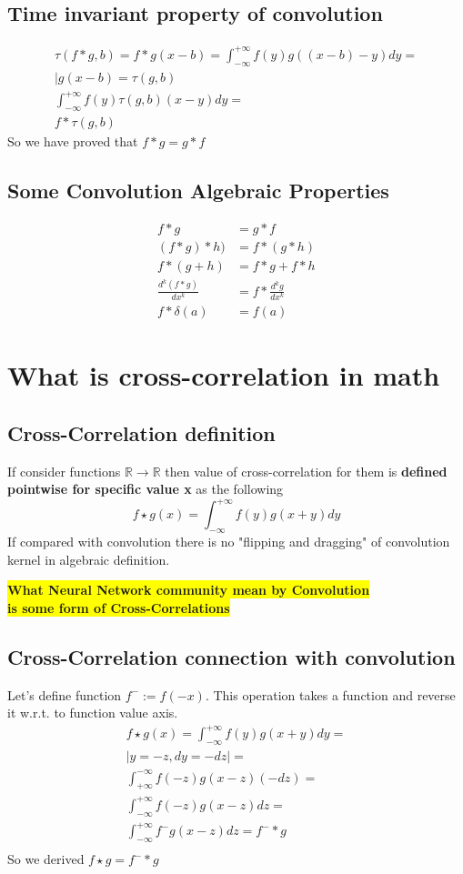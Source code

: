 \documentclass[12pt,a4paper]{article}
\theoremstyle{plain}
\begin{document}
\subsection{Time invariant property of convolution}
\begin{multline}\label{lti_convolution_property}
\tau(f*g,b)=f*g(x-b)=\int^{+\infty}_{-\infty} f(y)g((x-b)-y)dy=\\
|g(x-b)=\tau(g,b)\\
\int^{+\infty}_{-\infty}  f(y)\tau(g,b)(x-y)dy=\\
f*\tau(g,b)
\end{multline}
So we have proved that $f*g=g*f$
\subsection{Some Convolution Algebraic Properties}
\begin{align}
f*g&=g*f\\
(f*g)*h)&=f*(g*h)\\
f*(g+h)&=f*g+f*h\\
\frac{{d}^{k}{(f*g)}}{dx^k}&=f*\frac{{d}^{k}{g}}{dx^k}\\
f*\delta (a)&=f(a)
\end{align}
\section{What is cross-correlation in math}
\subsection{Cross-Correlation definition}
If consider functions $\mathbb{R} \to \mathbb{R}$ then value of cross-correlation for them is \textbf{defined pointwise for specific value x} as the following
\begin{equation}\label{cross-correlation}
f \star g(x)=\int^{+\infty}_{-\infty} f(y)g(x+y)dy
\end{equation}
If compared with convolution there is no "flipping and dragging" of convolution kernel in algebraic definition.
\begin{flushleft}
 \colorbox{yellow}{\textbf{What Neural Network community mean by Convolution}}\\
 \colorbox{yellow}{\textbf{is some form of Cross-Correlations}}
\end{flushleft}
\subsection{Cross-Correlation connection with convolution}
Let's define function $f^{-}:=f(-x)$. This operation takes a function and reverse it w.r.t. to function value axis.
\begin{multline}
f \star g(x)=\int^{+\infty}_{-\infty} f(y)g(x+y)dy=\\
|y=-z,dy=-dz|=\\
\int^{-\infty}_{+\infty} f(-z)g(x-z)(-dz)=\\
\int^{+\infty}_{-\infty} f(-z)g(x-z)dz=\\
\int^{+\infty}_{-\infty} f^{-}g(x-z)dz=f^{-}*g\\
\end{multline}
So we derived $f \star g=f^{-}*g$
\end{document}
